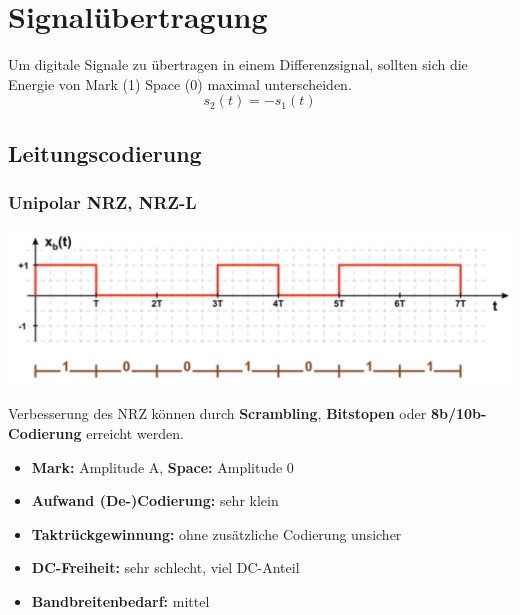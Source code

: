 \section{Signalübertragung}
Um digitale Signale zu übertragen in einem Differenzsignal, sollten sich die Energie von Mark (1) Space (0) maximal unterscheiden.
\[
s_2(t) = -s_1(t)
\]

\subsection{Leitungscodierung}
\subsubsection{Unipolar NRZ, NRZ-L}
\begin{center}
	\includegraphics[width=0.6\columnwidth]{Images/nrz}
\end{center}
Verbesserung des NRZ können durch \textbf{Scrambling}, \textbf{Bitstopen} oder \textbf{8b/10b-Codierung} erreicht werden.\\

\begin{itemize}[nosep]
	\item \textbf{Mark:} Amplitude A, \textbf{Space:} Amplitude 0
	\item \textbf{Aufwand (De-)Codierung:} sehr klein
	\item \textbf{Taktrückgewinnung:} ohne zusätzliche Codierung unsicher
	\item \textbf{DC-Freiheit:} sehr schlecht, viel DC-Anteil
	\item \textbf{Bandbreitenbedarf:} mittel
\end{itemize}


